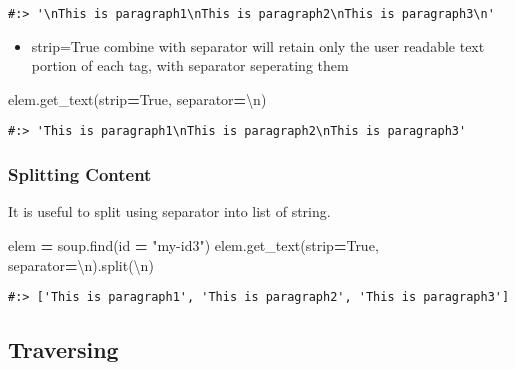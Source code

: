 \documentclass[
]{book}
\newenvironment{Shaded}{\begin{snugshade}}{\end{snugshade}}
\newcommand{\BuiltInTok}[1]{#1}
\newcommand{\CharTok}[1]{\textcolor[rgb]{0.5,0.5,0.5}{#1}}
\newcommand{\NormalTok}[1]{#1}
\newcommand{\OperatorTok}[1]{\textcolor[rgb]{0.43,0.43,0.43}{\textbf{#1}}}
\newcommand{\StringTok}[1]{\textcolor[rgb]{0.5,0.5,0.5}{#1}}
\newcommand{\VariableTok}[1]{\textcolor[rgb]{0,0,0}{#1}}
\providecommand{\tightlist}{%
  \setlength{\itemsep}{0pt}\setlength{\parskip}{0pt}}
\begin{document}
\begin{verbatim}
#:> '\nThis is paragraph1\nThis is paragraph2\nThis is paragraph3\n'
\end{verbatim}

\begin{itemize}
\tightlist
\item
  strip=True combine with separator will retain only the user readable text portion of each tag, with separator seperating them
\end{itemize}

\begin{Shaded}
\begin{Highlighting}[]
\NormalTok{elem.get\_text(strip}\OperatorTok{=}\VariableTok{True}\NormalTok{, separator}\OperatorTok{=}\StringTok{\textquotesingle{}}\CharTok{\textbackslash{}n}\StringTok{\textquotesingle{}}\NormalTok{)}
\end{Highlighting}
\end{Shaded}

\begin{verbatim}
#:> 'This is paragraph1\nThis is paragraph2\nThis is paragraph3'
\end{verbatim}

\hypertarget{splitting-content}{%
\subsubsection{Splitting Content}\label{splitting-content}}

It is useful to split using separator into list of string.

\begin{Shaded}
\begin{Highlighting}[]
\NormalTok{elem }\OperatorTok{=}\NormalTok{ soup.find(}\BuiltInTok{id} \OperatorTok{=} \StringTok{"my{-}id3"}\NormalTok{)}
\NormalTok{elem.get\_text(strip}\OperatorTok{=}\VariableTok{True}\NormalTok{, separator}\OperatorTok{=}\StringTok{\textquotesingle{}}\CharTok{\textbackslash{}n}\StringTok{\textquotesingle{}}\NormalTok{).split(}\StringTok{\textquotesingle{}}\CharTok{\textbackslash{}n}\StringTok{\textquotesingle{}}\NormalTok{)}
\end{Highlighting}
\end{Shaded}

\begin{verbatim}
#:> ['This is paragraph1', 'This is paragraph2', 'This is paragraph3']
\end{verbatim}

\hypertarget{traversing}{%
\subsection{Traversing}\label{traversing}}
\end{document}
